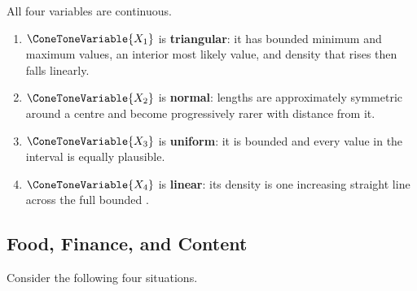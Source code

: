 	All four variables are continuous.
	\begin{enumerate}
		\item $\ConeToneVariable{X_1}$ is \textbf{triangular}: it has bounded minimum and maximum values, an interior most likely value, and density that rises then falls linearly.
		\item $\ConeToneVariable{X_2}$ is \textbf{normal}: lengths are approximately symmetric around a centre and become progressively rarer with distance from it.
		\item $\ConeToneVariable{X_3}$ is \textbf{uniform}: it is bounded and every value in the interval is equally plausible.
		\item $\ConeToneVariable{X_4}$ is \textbf{linear}: its density is one increasing straight line across the full bounded .
	\end{enumerate}


	\subsection{Food, Finance, and Content}
	\label{sec:food-finance-content}

	Consider the following four situations.

